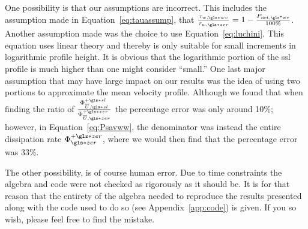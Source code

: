 One possibility is that our assumptions are incorrect. This includes the assumption made in Equation~\eqref{eq:tauassump}, that $\frac{\tau_{w,\gls*{wv}}}{\tau_{w,\gls*{zer}}}=1-\frac{P_\text{net,\gls*{wv}} }{100\%}$. Another assumption made was the choice to use Equation~\eqref{eq:luchini}. This equation uses linear theory and thereby is only suitable for small increments in logarithmic profile height. It is obvious that the logarithmic portion of the \gls*{ssl} profile is much higher than one might consider ``small.'' One last major assumption that may have large impact on our results was the idea of using two portions to approximate the mean velocity profile. Although we found that when finding the ratio of $\frac{\Phi _{\overline{U},\gls*{sl}}\ps}{\Phi _{\overline{U},\gls*{zer}}\pz}$ the percentage error was only around 10\%; however, in Equation~\eqref{eq:Psavww}, the denominator was instead the entire dissipation rate $\Phi _{\gls*{zer}}\pz$, where we would then find that the percentage error was 33\%.

The other possibility, is of course human error. Due to time constraints the algebra and code were not checked as rigorously as it should be. It is for that reason that the entirety of the algebra needed to reproduce the results presented along with the code used to do so (see Appendix~\ref{app:code}) is given. If you so wish, please feel free to find the mistake.
